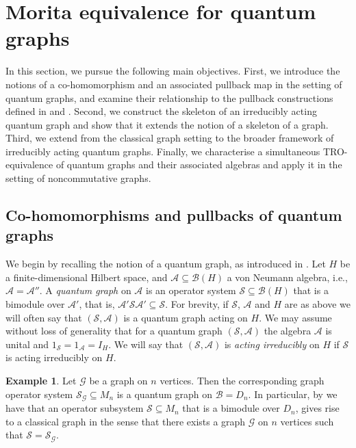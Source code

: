 \documentclass[11pt]{amsart}
\numberwithin{equation}{section}
\theoremstyle{plain}
\theoremstyle{definition}
\newtheorem{example}[theorem]{Example}
\theoremstyle{remark}
\newcommand{\A}{{\mathcal{A}}}
\newcommand{\B}{{\mathcal{B}}}
\newcommand{\G}{{\mathcal{G}}}
\renewcommand{\S}{{\mathcal{S}}}
\begin{document}

\section{Morita equivalence for quantum graphs}\label{sec:qgraphs}

In this section, we pursue the following main objectives. First, we introduce the notions of a co-homomorphism and an associated pullback map in the setting of quantum graphs, and examine their relationship to the pullback constructions defined in \cite{Wea21} and \cite{EKT21}. Second, we construct the skeleton of an irreducibly acting quantum graph and show that it extends the notion of a skeleton of a graph. Third, 
we extend \cite[Corollary 7.6]{EKT21} from the classical graph setting to the broader framework of irreducibly acting quantum graphs. Finally, we characterise a simultaneous TRO-equivalence of quantum graphs and their associated algebras and apply it in the setting of noncommutative graphs.

\subsection{Co-homomorphisms and pullbacks of quantum graphs}
We begin by recalling the notion of a quantum graph, as introduced in \cite{Wea12}. Let $H$ be a finite-dimensional Hilbert space, and $\A \subseteq \B(H)$ a von Neumann algebra, i.e., $\A=\A''$. A \textit{quantum graph} on $\A$ is an operator system $\S \subseteq \B(H)$ that is a bimodule over $\A'$, that is,  $\A'\S\A' \subseteq \S$. For brevity, if $\S$, $\A$ and $H$ are as above we will often say that $(\S,\A)$ is a quantum graph acting on $H$. We may assume without loss of generality that for a quantum graph $(\S,\A)$ the algebra $\A$ is unital and $1_\S=1_\A=I_H$. We will say that $(\S,\A)$ is \emph{acting irreducibly} on $H$ if $\S$ is acting irreducibly on $H$.

\begin{example}
Let $\G$ be a graph on $n$ vertices. Then the corresponding graph operator system $\S_{\G} \subseteq M_{n}$ is a quantum graph on $\B = D_{n}$. In particular, by \cite[Proposition 1.1]{PPS89} we have that an operator subsystem $ \S\subseteq M_n$ that is a bimodule over $D_n$, gives rise to a classical graph in the sense that there exists a graph $ \G$ on $n$ vertices such that $\S=\S_{\G}$.
\end{example}
\end{document}
